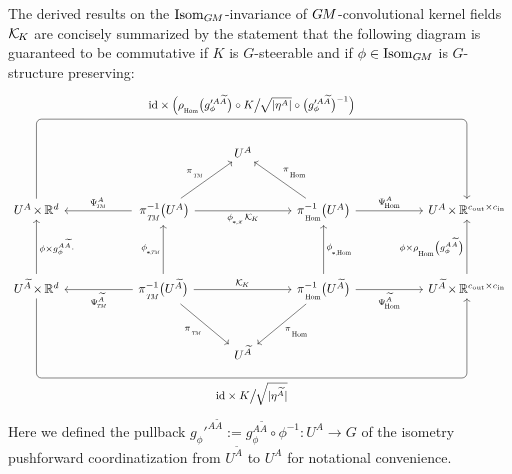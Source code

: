 The derived results on the $\operatorname{Isom}_{G\mkern-1.4muM}$-invariance of $G\mkern-1.4muM$-convolutional kernel fields $\mathcal{K}_{\mkern-2mu K}$ are concisely summarized by the statement that the following diagram is guaranteed to be commutative if $K$ is $G$-steerable and if $\phi \in \operatorname{Isom}_{G\mkern-1.4muM}$ is $G$-structure preserving:
\begin{equation}
    \begin{tikzcd}[row sep=4.em, column sep=5.5em] %
        & &[-2.7em] U^A &[-2.7em] & \\[-1em]
        U^A \mkern-2mu\times\mkern-1mu \R^d
            \arrow[rrrr, rounded corners, to path={ 
                    -- ([yshift=15ex]\tikztostart.north) 
                    --node[above]{\small
                            $\id\times \pig( \rhoHom\big(g'^{A\widetilde{A}}_\phi\big) \circ K \big/\mkern-2mu \sqrt{|\eta^A|} \circ \big(g'^{A\widetilde{A}}_\phi\big)^{-1} \pig)$
                            } ([yshift=15ex]\tikztotarget.north) 
                    -- (\tikztotarget.north)
                    }]
        &
        \,\piTM^{-1}\big(U^A\big)
            \arrow[ru, "\piTM"]
            \arrow[rr, "\dphiK \KK"']
            \arrow[l, "\PsiTM^A"']
        & &
        \piHom^{-1}\big(U^A\big)
            \arrow[lu, "\piHom"']
            \arrow[r, "\PsiHom^A"]
        &
        U^A \mkern-2mu\times\mkern-1mu \R^{\cout\times\cin}
        \\
        U^{\widetilde{A}} \mkern-2mu\times\mkern-1mu \R^d
            \arrow[u, "\phi \times g_\phi^{A\widetilde{A}}\cdot"']
            \arrow[rrrr, rounded corners, to path={ 
                    -- ([yshift=-15ex]\tikztostart.south) 
                    --node[below]{\small$\id\times K \big/\mkern-2mu \sqrt{|\eta^{\widetilde{A}}|}$} ([yshift=-15ex]\tikztotarget.south) 
                    -- (\tikztotarget.south)
                    }]
        &
        \piTM^{-1}\big(U^{\widetilde{A}}\big)
            \arrow[rd, "\piTM"']
            \arrow[rr, "\KK"]
            \arrow[u, "\dphiTM"]
            \arrow[l, "\PsiTM^{\widetilde{A}}"]
        & &
        \piHom^{-1}\big(U^{\widetilde{A}}\big)
            \arrow[ld, "\piHom"]
            \arrow[u, "\dphiHom"']
            \arrow[r, "\PsiHom^{\widetilde{A}}"']
        &
        U^{\widetilde{A}} \mkern-2mu\times\mkern-1mu \R^{\cout\times\cin}
            \arrow[u, "\phi \times \rhoHom\big(g_\phi^{A\widetilde{A}}\big)"]
        \\[-1em]
        & & U^{\widetilde{A}}
        & &
    \end{tikzcd}
\end{equation}
Here we defined the pullback $g_\phi'^{A\widetilde{A}} := g_\phi^{A\widetilde{A}} \circ \phi^{-1} : U^A \to G$ of the isometry pushforward coordinatization from $U^{\widetilde{A}}$ to $U^A$ for notational convenience.


